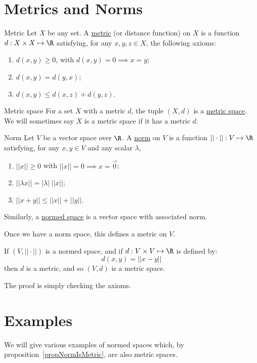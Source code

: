\documentclass[../Main.tex]{subfiles}
\begin{document}
\section{Metrics and Norms}
\begin{definition}{Metric}
    Let $X$ be any set. A \underline{metric} (or distance function) on $X$ is a function $d : X \times X \mapsto \R$ satisfying, for any $x, y, z \in X$, the following axioms:
    \begin{enumerate}
        \item $d(x, y) \geq 0$, with $d(x, y) = 0 \implies x = y$;
        \item $d(x, y) = d(y, x)$;
        \item $d(x, y) \leq d(x, z) + d(y, z)$.
    \end{enumerate}
\end{definition}
\begin{definition}{Metric space}
    For a set $X$ with a metric $d$, the tuple $(X, d)$ is a \underline{metric space}. We will sometimes say $X$ is a metric space if it has a metric $d$.
\end{definition}
\begin{definition}{Norm}
    Let $V$ be a vector space over $\R$. A \underline{norm} on $V$ is a function $||\cdot|| : V \mapsto \R$ satisfying, for any $x, y \in V$ and any scalar $\lambda$,
    \begin{enumerate}
        \item $||x|| \geq 0$ with $||x|| = 0 \implies x = \vec{0}$;
        \item $||\lambda x|| = |\lambda|~||x||$;
        \item $||x + y|| \leq ||x|| + ||y||$.
    \end{enumerate}
\end{definition}
Similarly, a \underline{normed space} is a vector space with associated norm.

Once we have a norm space, this defines a metric on $V$.
\begin{proposition}
    If $(V, ||\cdot||)$ is a normed space, and if $d : V \times V \mapsto \R$ is defined by:
    \begin{equation*}
        d(x, y) = ||x - y||
    \end{equation*}
    then $d$ is a metric, and so $(V, d)$ is a metric space.
    \label{propNormIsMetric}
\end{proposition}
The proof is simply checking the axioms.
\section{Examples}
We will give various examples of normed spaces which, by proposition~\ref{propNormIsMetric}, are also metric spaces.
\end{document}
